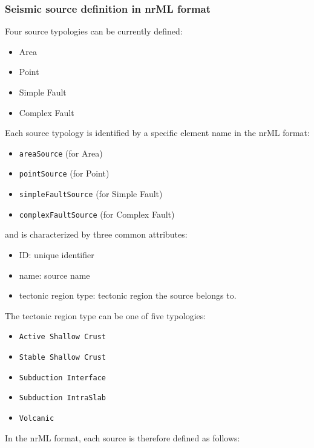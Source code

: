 \subsubsection{Seismic source definition in nrML format}\label{seismicSourceNrml}
Four source typologies can be currently defined:
\begin{itemize}
\item Area
\item Point
\item Simple Fault
\item Complex Fault
\end{itemize}
Each source typology is identified by a specific element name in the nrML format:
\begin{itemize}
\item \Verb+areaSource+ (for Area)
\item \Verb+pointSource+ (for Point)
\item \Verb+simpleFaultSource+ (for Simple Fault)
\item \Verb+complexFaultSource+ (for Complex Fault)
\end{itemize}
and is characterized by three common attributes:
\begin{itemize}
\item ID: unique identifier 
\item name: source name
\item tectonic region type: tectonic region the source belongs to. 
\end{itemize}
The tectonic region type can be one of five typologies:
\begin{itemize}
\item \Verb+Active Shallow Crust+
\item \Verb+Stable Shallow Crust+
\item \Verb+Subduction Interface+
\item \Verb+Subduction IntraSlab+
\item \Verb+Volcanic+
\end{itemize}
In the nrML format, each source is therefore defined as follows:
